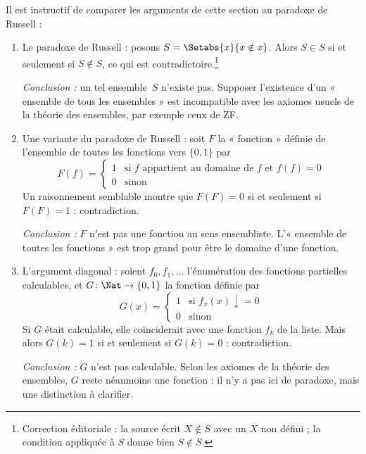 \documentclass[../../../include/open-logic-section]{subfiles}
\begin{document}

Il est instructif de comparer les arguments
de cette section au paradoxe de Russell :
\begin{enumerate}
\item Le paradoxe de Russell : posons
  $S = \Setabs{x}{x \notin x}$. Alors
  $S\in S$ si et seulement si $S\notin S$,
  ce qui est contradictoire.\footnote{Correction éditoriale : la source écrit $X\notin S$ avec un $X$ non défini ; la condition appliquée à $S$ donne bien $S\notin S$.}

  \emph{Conclusion :} un tel ensemble~$S$
  n'existe pas. Supposer l'existence d'un
  « ensemble de tous les ensembles » est
  incompatible avec les axiomes usuels de
  la théorie des ensembles, par exemple ceux de ZF.

\item Une variante du paradoxe de Russell :
  soit $F$ la « fonction » définie de
  l'ensemble de toutes les fonctions vers
  $\{0,1\}$ par
  \[
  F(f) =
  \begin{cases}
    1 & \text{si $f$ appartient au domaine de $f$ et $f(f)=0$}\\
    0 & \text{sinon}
  \end{cases}
  \]
  Un raisonnement semblable montre que
  $F(F)=0$ si et seulement si $F(F)=1$ :
  contradiction.

  \emph{Conclusion :} $F$ n'est pas une
  fonction au sens ensembliste. L'« ensemble de toutes les
  fonctions » est trop grand pour être
  le domaine d'une fonction.

\item L'argument diagonal : soient
  $f_0,f_1,\dots$ l'énumération des fonctions
  partielles calculables, et
  $G\colon\Nat\to\{0,1\}$ la fonction définie par
  \[
  G(x) =
  \begin{cases}
    1 & \text{si $f_x(x)\downarrow = 0$}\\
    0 & \text{sinon}
  \end{cases}
  \]
  Si $G$ était calculable, elle coïnciderait
  avec une fonction $f_k$ de la liste.
  Mais alors $G(k)=1$ si et seulement si
  $G(k)=0$ : contradiction.

  \emph{Conclusion :} $G$ n'est pas calculable.
  Selon les axiomes de la théorie des ensembles,
  $G$ reste néanmoins une fonction : il n'y
  a pas ici de paradoxe, mais une distinction
  à clarifier.
\end{enumerate}
\end{document}
